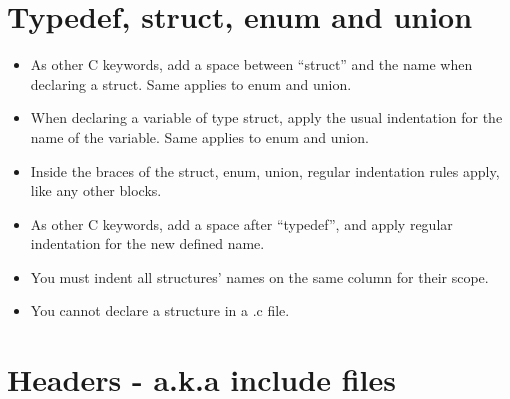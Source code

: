 \documentclass{42-en}
\begin{document}
        \newpage


    \section{Typedef, struct, enum and union}

        \begin{itemize}

        \item As other C keywords, add a space between ``struct'' and the name
          when declaring a struct. Same applies to enum and union.

        \item When declaring a variable of type struct, apply the usual indentation for the name
          of the variable. Same applies to enum and union.

        \item Inside the braces of the struct, enum, union, regular indentation rules
          apply, like any other blocks.

        \item As other C keywords, add a space after ``typedef'',
          and apply regular indentation for the new defined name.

        \item You must indent all structures' names on the same column for their scope.

        \item You cannot declare a structure in a .c file.

        \end{itemize}
        \newpage


    \section{Headers - a.k.a include files}
\end{document}
